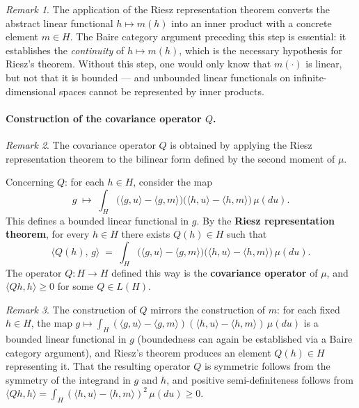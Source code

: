 \documentclass[11pt]{article}
\theoremstyle{definition}
\theoremstyle{remark}
\newtheorem{remark}{Remark}
\begin{document}
\begin{remark}
The application of the Riesz representation theorem converts the abstract linear functional $h \mapsto m(h)$ into an inner product with a concrete element $m \in H$.  The Baire category argument preceding this step is essential: it establishes the \emph{continuity} of $h \mapsto m(h)$, which is the necessary hypothesis for Riesz's theorem.  Without this step, one would only know that $m(\cdot)$ is linear, but not that it is bounded --- and unbounded linear functionals on infinite-dimensional spaces cannot be represented by inner products.
\end{remark}

\paragraph{Construction of the covariance operator $Q$.}
\begin{remark}
The covariance operator $Q$ is obtained by applying the Riesz representation theorem to the bilinear form defined by the second moment of $\mu$.
\end{remark}
Concerning $Q$: for each $h \in H$, consider the map
\[
    g \;\longmapsto\;
    \int_H \bigl(\langle g, u \rangle - \langle g, m \rangle\bigr)
           \bigl(\langle h, u \rangle - \langle h, m \rangle\bigr)
    \,\mu(du).
\]
This defines a bounded linear functional in $g$.
By the \textbf{Riesz representation theorem}, for every $h \in H$ there
exists $Q(h) \in H$ such that
\[
    \langle Q(h),\, g \rangle
    \;=\;
    \int_H \bigl(\langle g, u \rangle - \langle g, m \rangle\bigr)
           \bigl(\langle h, u \rangle - \langle h, m \rangle\bigr)
    \,\mu(du).
\]
The operator $Q \colon H \to H$ defined this way is the
\textbf{covariance operator} of $\mu$,
and $\langle Qh,h \rangle \ge 0$ for some $Q \in L(H)$.

\begin{remark}
The construction of $Q$ mirrors the construction of $m$: for each fixed $h \in H$, the map $g \mapsto \int_H (\langle g, u\rangle - \langle g, m\rangle)(\langle h, u\rangle - \langle h, m\rangle)\,\mu(du)$ is a bounded linear functional in $g$ (boundedness can again be established via a Baire category argument), and Riesz's theorem produces an element $Q(h) \in H$ representing it.  That the resulting operator $Q$ is symmetric follows from the symmetry of the integrand in $g$ and $h$, and positive semi-definiteness follows from $\langle Qh, h\rangle = \int_H (\langle h, u\rangle - \langle h, m\rangle)^2\,\mu(du) \ge 0$.
\end{remark}
\end{document}
